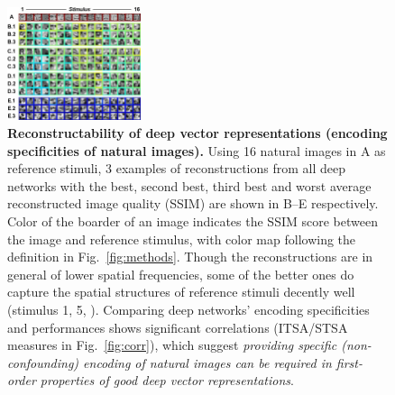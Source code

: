 \documentclass[10pt,twocolumn,letterpaper]{article}
\begin{document}
\begin{figure}
\begin{center}
\includegraphics[width=0.35\textwidth]{Figs/pic4.pdf} 
\end{center}
\caption{{\bf Reconstructability of deep vector representations (\ie encoding specificities of natural images).}
Using 16 natural images in A as reference stimuli, 3 examples of reconstructions from all deep networks with the best, second best, third best and worst average reconstructed image quality (SSIM) are shown in B--E respectively.
Color of the boarder of an image indicates the SSIM score between the image and reference stimulus, with color map following the definition in Fig.~\ref{fig:methods}.
Though the reconstructions are in general of lower spatial frequencies, some of the better ones do capture the spatial structures of reference stimuli decently well (\eg stimulus 1, 5, \etc).
Comparing deep networks' encoding specificities and performances shows significant correlations (ITSA/STSA measures in Fig.~\ref{fig:corr}), which suggest \emph{providing specific (\ie non-confounding) encoding of natural images can be required in first-order properties of good deep vector representations}.
} %
\label{fig:encspc}
\end{figure}
\end{document}
